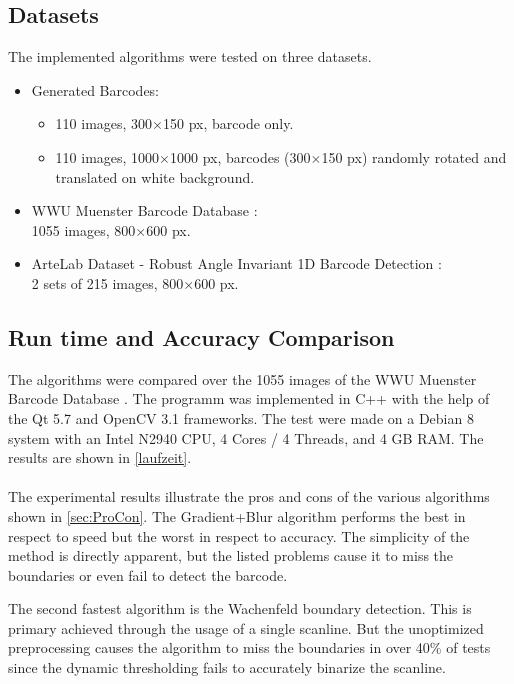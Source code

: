 \subsection{Datasets}
The implemented algorithms were tested on three datasets.
\begin{itemize}
\item Generated Barcodes:
\begin{itemize}
\item 110 images, 300$\times$150 px, barcode only.
\item 110 images, 1000$\times$1000 px, barcodes (300$\times$150 px) randomly rotated and translated on white background.
\end{itemize}
\item WWU Muenster Barcode Database \cite{MuensterBarcodeDB} \citep{wachenfeld2008robust}:\\
1055 images, 800$\times$600 px.
\item ArteLab Dataset - Robust Angle Invariant 1D Barcode Detection \cite{ArteLabDB} \cite{zamberletti2010neural} \citep{zamberletti2013robust}:\\
2 sets of 215 images, 800$\times$600 px.
\end{itemize}

\subsection{Run time and Accuracy Comparison}
The algorithms were compared over the 1055 images of the WWU Muenster Barcode Database \citep{MuensterBarcodeDB}. The programm was implemented in C++ with the help of the Qt 5.7 and OpenCV 3.1 frameworks. The test were made on a Debian 8 system with an Intel N2940 CPU, 4 Cores / 4 Threads, and 4 GB RAM. The results are shown in \cref{laufzeit}.
\\
\\
The experimental results illustrate the pros and cons of the various algorithms
shown in \cref{sec:ProCon}. The Gradient+Blur algorithm performs the best in
respect to speed but the worst in respect to accuracy. The simplicity of the
method is directly apparent, but the listed problems cause it to miss the boundaries or even fail to detect the barcode.

The second fastest algorithm is the Wachenfeld boundary detection. This is
primary achieved through the usage of a single scanline. But the unoptimized
preprocessing causes the algorithm to miss the boundaries in over 40\% of tests
since the dynamic thresholding fails to accurately binarize the scanline.

